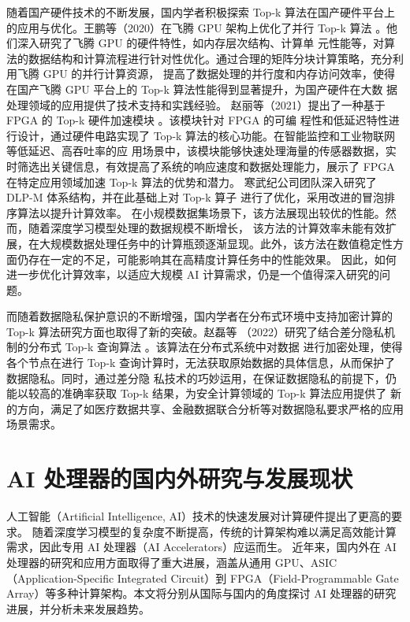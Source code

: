 随着国产硬件技术的不断发展，国内学者积极探索 Top-k 算法在国产硬件平台上的应用与优化。王鹏等（2020）在飞腾 GPU 
架构上优化了并行 Top-k 算法 \cite {wang2020}。他们深入研究了飞腾 GPU 的硬件特性，如内存层次结构、计算单
元性能等，对算法的数据结构和计算流程进行针对性优化。通过合理的矩阵分块计算策略，充分利用飞腾 GPU 的并行计算资源，
提高了数据处理的并行度和内存访问效率，使得在国产飞腾 GPU 平台上的 Top-k 算法性能得到显著提升，为国产硬件在大数
据处理领域的应用提供了技术支持和实践经验。
赵丽等（2021）提出了一种基于 FPGA 的 Top-k 硬件加速模块 \cite {Zhao2021}。该模块针对 FPGA 的可编
程性和低延迟特性进行设计，通过硬件电路实现了 Top-k 算法的核心功能。在智能监控和工业物联网等低延迟、高吞吐率的应
用场景中，该模块能够快速处理海量的传感器数据，实时筛选出关键信息，有效提高了系统的响应速度和数据处理能力，展示了 
FPGA 在特定应用领域加速 Top-k 算法的优势和潜力。
寒武纪公司团队深入研究了 DLP-M 体系结构，并在此基础上对 Top-k 算子 进行了优化，采用改进的冒泡排序算法以提升计算效率。
在小规模数据集场景下，该方法展现出较优的性能。然而，随着深度学习模型处理的数据规模不断增长，
该方法的计算效率未能有效扩展，在大规模数据处理任务中的计算瓶颈逐渐显现。此外，该方法在数值稳定性方面仍存在一定的不足，可能影响其在高精度计算任务中的性能效果。
因此，如何进一步优化计算效率，以适应大规模 AI 计算需求，仍是一个值得深入研究的问题。

而随着数据隐私保护意识的不断增强，国内学者在分布式环境中支持加密计算的 Top-k 算法研究方面也取得了新的突破。赵磊等
（2022）研究了结合差分隐私机制的分布式 Top-k 查询算法 \cite {zhao2022}。该算法在分布式系统中对数据
进行加密处理，使得各个节点在进行 Top-k 查询计算时，无法获取原始数据的具体信息，从而保护了数据隐私。同时，通过差分隐
私技术的巧妙运用，在保证数据隐私的前提下，仍能以较高的准确率获取 Top-k 结果，为安全计算领域的 Top-k 算法应用提供了
新的方向，满足了如医疗数据共享、金融数据联合分析等对数据隐私要求严格的应用场景需求。

\section{AI 处理器的国内外研究与发展现状}

人工智能（Artificial Intelligence, AI）技术的快速发展对计算硬件提出了更高的要求。
随着深度学习模型的复杂度不断提高，传统的计算架构难以满足高效能计算需求，因此专用 AI 处理器（AI Accelerators）应运而生。
近年来，国内外在 AI 处理器的研究和应用方面取得了重大进展\cite{yishouyi}，涵盖从通用 GPU、ASIC（Application-Specific Integrated Circuit）到 FPGA（Field-Programmable Gate Array）等多种计算架构。本文将分别从国际与国内的角度探讨 AI 处理器的研究进展，并分析未来发展趋势。

